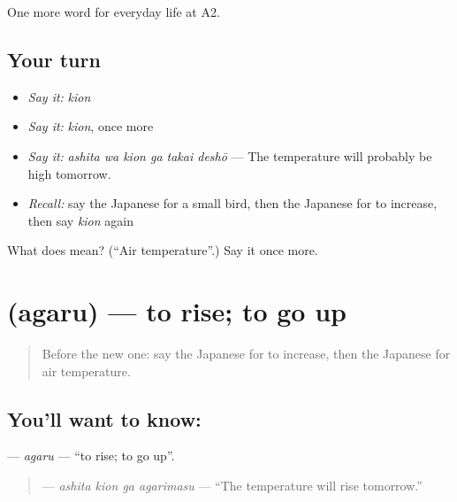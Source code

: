 \begin{grammarlens}[title={What you've built}]
One more word for everyday life at A2.
\end{grammarlens}

\subsection*{Your turn}
\begin{itemize}
\raggedright
  \item \emph{Say it:} \emph{kion}
  \item \emph{Say it:} \emph{kion}, once more
  \item \emph{Say it:} \emph{ashita wa kion ga takai deshō} — The temperature will probably be high tomorrow.
  \item \emph{Recall:} say the Japanese for a small bird, then the Japanese for to increase, then say \emph{kion} again
\end{itemize}

\begin{tcolorbox}[breakable,colback=teal!4,colframe=teal!35!black,title={Before you move on}]
What does  mean? (\textquotedblleft{}Air temperature\textquotedblright{}.) Say it once more.
\end{tcolorbox}
\section[\texorpdfstring{\ja{あがる} (agaru)}{あがる (agaru)}]{ (agaru) — to rise; to go up}

\label{lesson:JA-C212-agaru}



\begin{quote}
Before the new one: say the Japanese for to increase, then the Japanese for air temperature.
\end{quote}

\subsection*{You'll want to know: }
\textbf{} — \emph{agaru} — \textquotedblleft{}to rise; to go up\textquotedblright{}.

\begin{quote}
\textbf{  } — \emph{ashita kion ga agarimasu} — \textquotedblleft{}The temperature will rise tomorrow.\textquotedblright{}
\end{quote}

